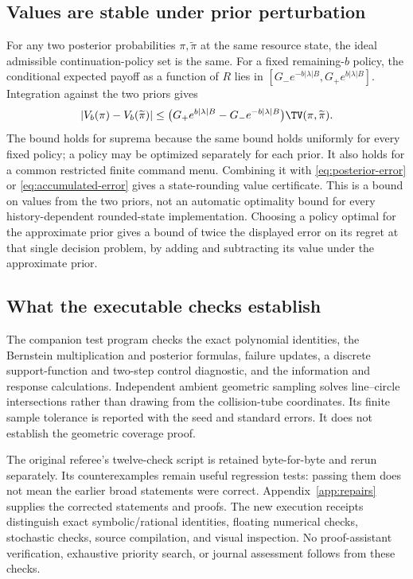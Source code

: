 \subsection{Values are stable under prior perturbation}
For any two posterior probabilities $\pi,\widetilde\pi$ at the same resource
state, the ideal admissible continuation-policy set is the same. For a
fixed remaining-$b$ policy, the conditional expected payoff as a function of
$R$ lies in $[G_-e^{-b|\lambda|B},G_+e^{b|\lambda|B}]$. Integration against
the two priors gives
\begin{equation}
 |V_b(\pi)-V_b(\widetilde\pi)|\le
 \bigl(G_+e^{b|\lambda|B}-G_-e^{-b|\lambda|B}\bigr)
                         \TV(\pi,\widetilde\pi).
 \label{eq:value-stability}
\end{equation}
The bound holds for suprema because the same bound holds uniformly for
every fixed policy; a policy may be optimized separately for each prior.
It also holds for a common restricted finite command menu. Combining it
with \eqref{eq:posterior-error} or \eqref{eq:accumulated-error} gives a
state-rounding value certificate. This is a bound on values from the two
priors, not an automatic optimality bound for every history-dependent
rounded-state implementation. Choosing a policy optimal for the approximate
prior gives a bound of twice the displayed error on its regret at that
single decision problem, by adding and subtracting its value under the
approximate prior.

\subsection{What the executable checks establish}
The companion test program checks the exact polynomial identities, the
Bernstein multiplication and posterior formulas, failure updates, a discrete
support-function and two-step control diagnostic, and the information and
response calculations. Independent ambient geometric sampling solves
line--circle intersections rather than drawing from the collision-tube
coordinates. Its finite sample tolerance is reported with the seed and
standard errors. It does not establish the geometric coverage proof.

The original referee's twelve-check script is retained byte-for-byte and
rerun separately. Its counterexamples remain useful regression tests:
passing them does not mean the earlier broad statements were correct.
Appendix~\ref{app:repairs} supplies the corrected statements and proofs.
The new execution receipts distinguish exact symbolic/rational identities,
floating numerical checks, stochastic checks, source compilation, and visual
inspection. No proof-assistant verification, exhaustive priority search, or
journal assessment follows from these checks.
